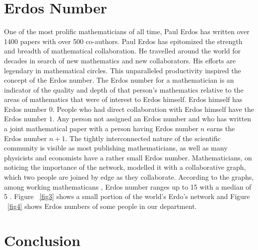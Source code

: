 \documentclass[12pt]{article}
\theoremstyle{definition}
\begin{document}
\section{Erdos Number} \label{erdos}

One of the most prolific mathematicians of all time, Paul Erdos has written over 1400 papers with over 500 co-authors. Paul Erdos has epitomized the strength and breadth of mathematical collaboration. He travelled around the world for decades in search of new mathematics and new collaborators. His efforts are legendary in mathematical circles. This unparalleled productivity inspired the concept of the Erdos number. The Erdos number for a mathematician is an indicator of the quality and depth of that person's mathematics relative to the areas of mathematics that were of interest to Erdos himself. Erdos himself has Erdos number $0$. People who had direct collaboration with Erdos himself have the Erdos number $1$. Any person not assigned an Erdos number and who has written a joint mathematical paper with a person having Erdos number $n$ earns the Erdos number $n+1$. The tightly interconnected nature of the scientific community is visible as most publishing mathematicians, as well as many physicists and economists have a rather small Erdos number. Mathematicians, on noticing the importance of the network, modelled it with a collaborative graph, which two people are joined by edge as they collaborate. According to the graphs, among working mathematicans ,  Erdos number ranges up to 15 with a median of 5 \cite{yegnanarayanan2011note, barabasi2002evolution}. Figure ~\ref{fig3} shows a small portion of the world's Erdo's network and Figure ~\ref{fig4} shows Erdos numbers of some people in our department.\\

\section{Conclusion}\label{con}
\end{document}
